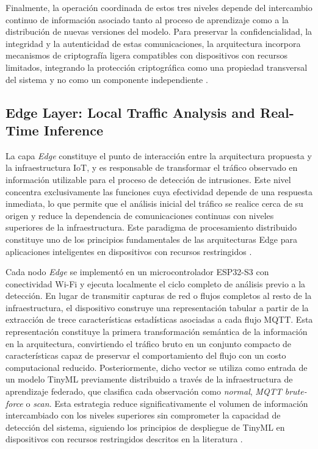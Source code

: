 \documentclass[journal,article,submit,moreauthors]{Definitions/mdpi}
\begin{document}
Finalmente, la operación coordinada de estos tres niveles depende del intercambio continuo de información asociado tanto al proceso de aprendizaje como a la distribución de nuevas versiones del modelo. Para preservar la confidencialidad, la integridad y la autenticidad de estas comunicaciones, la arquitectura incorpora mecanismos de criptografía ligera compatibles con dispositivos con recursos limitados, integrando la protección criptográfica como una propiedad transversal del sistema y no como un componente independiente \cite{NIST800232,Kaur2025}.

\subsection{Edge Layer: Local Traffic Analysis and Real-Time Inference}
La capa \textit{Edge} constituye el punto de interacción entre la arquitectura propuesta y la infraestructura IoT, y es responsable de transformar el tráfico observado en información utilizable para el proceso de detección de intrusiones. Este nivel concentra exclusivamente las funciones cuya efectividad depende de una respuesta inmediata, lo que permite que el análisis inicial del tráfico se realice cerca de su origen y reduce la dependencia de comunicaciones continuas con niveles superiores de la infraestructura. Este paradigma de procesamiento distribuido constituye uno de los principios fundamentales de las arquitecturas Edge para aplicaciones inteligentes en dispositivos con recursos restringidos \cite{SaravanaBalaji2023,Ficco2024}.
%

Cada nodo \textit{Edge} se implementó en un microcontrolador ESP32-S3 con conectividad Wi-Fi y ejecuta localmente el ciclo completo de análisis previo a la detección. En lugar de transmitir capturas de red o flujos completos al resto de la infraestructura, el dispositivo construye una representación tabular a partir de la extracción de trece características estadísticas asociadas a cada flujo MQTT. Esta representación constituye la primera transformación semántica de la información en la arquitectura, convirtiendo el tráfico bruto en un conjunto compacto de características capaz de preservar el comportamiento del flujo con un costo computacional reducido. Posteriormente, dicho vector se utiliza como entrada de un modelo TinyML previamente distribuido a través de la infraestructura de aprendizaje federado, que clasifica cada observación como \textit{normal}, \textit{MQTT brute-force} o \textit{scan}. Esta estrategia reduce significativamente el volumen de información intercambiado con los niveles superiores sin comprometer la capacidad de detección del sistema, siguiendo los principios de despliegue de TinyML en dispositivos con recursos restringidos descritos en la literatura \cite{Tekin2023,Amuthadevi2025,Dini2024}.
%
\end{document}
